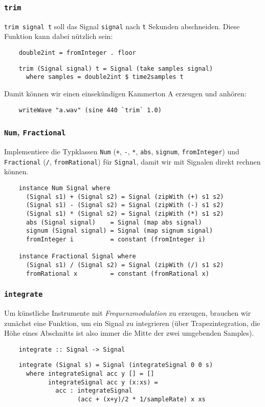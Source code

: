 \documentclass{beamer}
\begin{document}
\begin{frame}[fragile]
  \frametitle{\lstinline{trim}}
  \lstinline{trim signal t} soll das Signal \lstinline{signal} nach \lstinline{t} Sekunden abschneiden.
  Diese Funktion kann dabei nützlich sein:
  \begin{lstlisting}
    double2int = fromInteger . floor
  \end{lstlisting}
  \pause
  \begin{lstlisting}
    trim (Signal signal) t = Signal (take samples signal)
      where samples = double2int $ time2samples t
  \end{lstlisting}
  Damit können wir einen einsekündigen Kammerton A erzeugen und anhören:
  \begin{lstlisting}
    writeWave "a.wav" (sine 440 `trim` 1.0)
  \end{lstlisting}
\end{frame}

\begin{frame}[fragile]
  \frametitle{\lstinline{Num}, \lstinline{Fractional}}
  Implementiere die Typklassen \lstinline{Num} (\lstinline{+}, \lstinline{-}, \lstinline{*}, \lstinline{abs}, \lstinline{signum}, \lstinline{fromInteger})
  und \lstinline{Fractional} (\lstinline{/}, \lstinline{fromRational}) für \lstinline{Signal},
  damit wir mit Signalen direkt rechnen können.
  \pause
  \begin{lstlisting}
    instance Num Signal where
      (Signal s1) + (Signal s2) = Signal (zipWith (+) s1 s2)
      (Signal s1) - (Signal s2) = Signal (zipWith (-) s1 s2)
      (Signal s1) * (Signal s2) = Signal (zipWith (*) s1 s2)
      abs (Signal signal)    = Signal (map abs signal)
      signum (Signal signal) = Signal (map signum signal)
      fromInteger i          = constant (fromInteger i)
    
    instance Fractional Signal where
      (Signal s1) / (Signal s2) = Signal (zipWith (/) s1 s2)
      fromRational x         = constant (fromRational x)
  \end{lstlisting}
\end{frame}

\begin{frame}[fragile]
  \frametitle{\lstinline{integrate}}
  Um künstliche Instrumente mit \emph{Frequenzmodulation} zu erzeugen,
  brauchen wir zunächst eine Funktion,
  um ein Signal zu integrieren (über Trapezintegration,
  die Höhe eines Abschnitts ist also immer die Mitte der zwei umgebenden Samples).
  \begin{lstlisting}
    integrate :: Signal -> Signal
  \end{lstlisting}
  \pause
  \begin{lstlisting}
    integrate (Signal s) = Signal (integrateSignal 0 0 s)
      where integrateSignal acc y [] = []
            integrateSignal acc y (x:xs) =
              acc : integrateSignal
                    (acc + (x+y)/2 * 1/sampleRate) x xs
  \end{lstlisting}
\end{frame}
\end{document}
